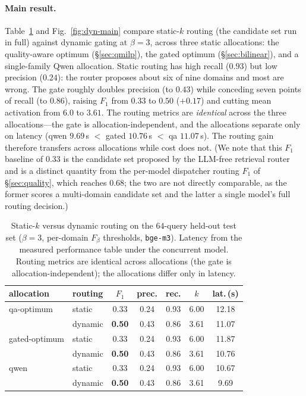 \documentclass[11pt]{article}
\begin{document}
\paragraph{Main result.}
Table~\ref{tab:dyn-main} and Fig.~\ref{fig:dyn-main} compare static-$k$ routing
(the candidate set run in full) against dynamic gating at $\beta=3$, across three
static allocations: the quality-aware optimum (§\ref{sec:qmilp}), the gated optimum
(§\ref{sec:bilinear}), and a single-family Qwen allocation. Static routing has high
recall ($0.93$) but low precision ($0.24$): the router proposes about six of nine
domains and most are wrong. The gate roughly doubles precision (to $0.43$) while
conceding seven points of recall (to $0.86$), raising $F_1$ from $0.33$ to $0.50$
($+0.17$) and cutting mean activation from $6.0$ to $3.61$. The routing metrics are
\emph{identical} across the three allocations---the gate is allocation-independent,
and the allocations separate only on latency (qwen $9.69$\,s $<$ gated $10.76$\,s
$<$ qa $11.07$\,s). The routing gain therefore transfers across allocations while
cost does not. (We note that this $F_1$ baseline of $0.33$ is the candidate set
proposed by the LLM-free retrieval router and is a distinct quantity from the
per-model dispatcher routing $F_1$ of §\ref{sec:quality}, which reaches $0.68$; the
two are not directly comparable, as the former scores a multi-domain candidate set
and the latter a single model's full routing decision.)

\begin{table}[H]
\centering
\caption{Static-$k$ versus dynamic routing on the $64$-query held-out test set
($\beta=3$, per-domain $F_\beta$ thresholds, \texttt{bge-m3}). Latency from the
measured performance table under the concurrent model. Routing metrics are identical
across allocations (the gate is allocation-independent); the allocations differ only
in latency.}
\label{tab:dyn-main}
\small
\begin{tabular}{llccccc}
\toprule
allocation & routing & $F_1$ & prec. & rec. & $k$ & lat.\,(s)\\
\midrule
qa-optimum    & static  & 0.33 & 0.24 & 0.93 & 6.00 & 12.18\\
              & dynamic & \textbf{0.50} & 0.43 & 0.86 & 3.61 & 11.07\\
gated-optimum & static  & 0.33 & 0.24 & 0.93 & 6.00 & 11.87\\
              & dynamic & \textbf{0.50} & 0.43 & 0.86 & 3.61 & 10.76\\
qwen          & static  & 0.33 & 0.24 & 0.93 & 6.00 & 10.67\\
              & dynamic & \textbf{0.50} & 0.43 & 0.86 & 3.61 & \phantom{0}9.69\\
\bottomrule
\end{tabular}
\end{table}
\end{document}

